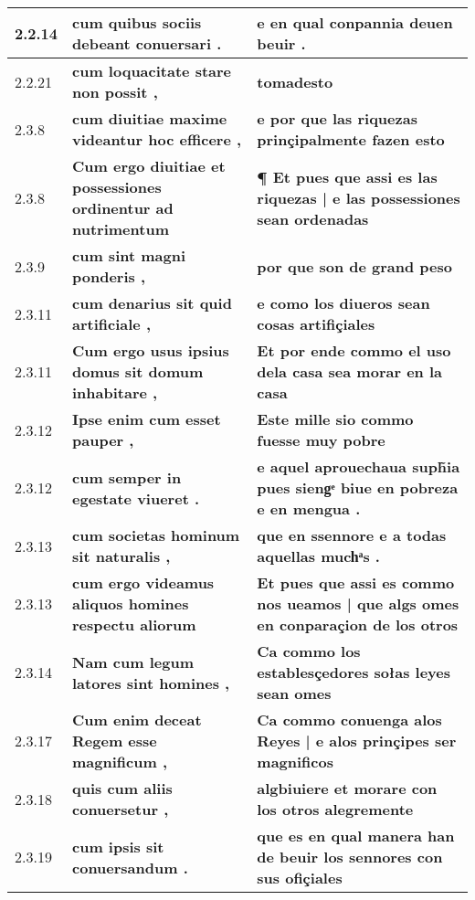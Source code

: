 \begin{tabular}{|p{1cm}|p{6.5cm}|p{6.5cm}|}
2.2.14 &  \textbf{ cum quibus sociis debeant conuersari . }  &  \textbf{ e en qual conpannia deuen beuir . }  \\\hline
2.2.21 &  \textbf{ cum loquacitate stare non possit , }  &  \textbf{ tomadesto }  \\\hline
2.3.8 &  \textbf{ cum diuitiae maxime videantur hoc efficere , }  &  \textbf{ e por que las riquezas prinçipalmente fazen esto }  \\\hline
2.3.8 &  \textbf{ Cum ergo diuitiae et possessiones ordinentur ad nutrimentum }  &  \textbf{ ¶ Et pues que assi es las riquezas | e las possessiones sean ordenadas }  \\\hline
2.3.9 &  \textbf{ cum sint magni ponderis , }  &  \textbf{ por que son de grand peso }  \\\hline
2.3.11 &  \textbf{ cum denarius sit quid artificiale , }  &  \textbf{ e como los diueros sean cosas artifiçiales }  \\\hline
2.3.11 &  \textbf{ Cum ergo usus ipsius domus sit domum inhabitare , }  &  \textbf{ Et por ende commo el uso dela casa sea morar en la casa }  \\\hline
2.3.12 &  \textbf{ Ipse enim cum esset pauper , }  &  \textbf{ Este mille sio commo fuesse muy pobre }  \\\hline
2.3.12 &  \textbf{ cum semper in egestate viueret . }  &  \textbf{ e aquel aprouechaua suph̃ia pues siengͤ biue en pobreza e en mengua . }  \\\hline
2.3.13 &  \textbf{ cum societas hominum sit naturalis , }  &  \textbf{ que en ssennore e a todas aquellas muchͣs . }  \\\hline
2.3.13 &  \textbf{ cum ergo videamus aliquos homines respectu aliorum }  &  \textbf{ Et pues que assi es commo nos ueamos | que algs omes en conparaçion de los otros }  \\\hline
2.3.14 &  \textbf{ Nam cum legum latores sint homines , }  &  \textbf{ Ca commo los establesçedores sołas leyes sean omes }  \\\hline
2.3.17 &  \textbf{ Cum enim deceat Regem esse magnificum , }  &  \textbf{ Ca commo conuenga alos Reyes | e alos prinçipes ser magnificos }  \\\hline
2.3.18 &  \textbf{ quis cum aliis conuersetur , }  &  \textbf{ algbiuiere et morare con los otros alegremente }  \\\hline
2.3.19 &  \textbf{ cum ipsis sit conuersandum . }  &  \textbf{ que es en qual manera han de beuir los sennores con sus ofiçiales }  \\\hline

\end{tabular}

